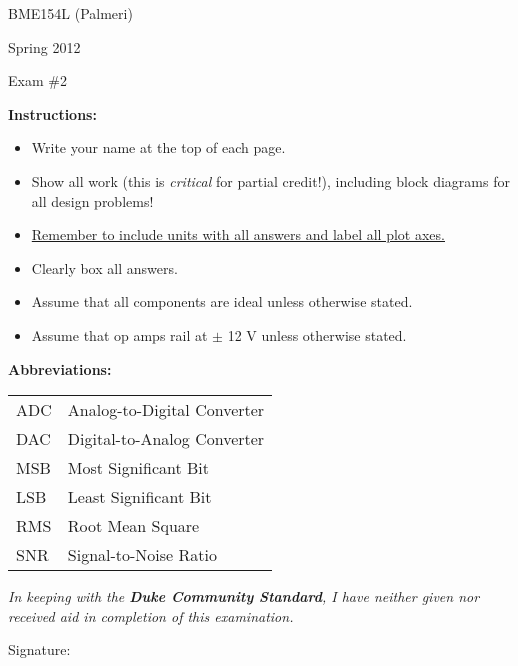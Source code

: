 

\vspace*{0.5in}

\centerline{\LARGE BME154L (Palmeri)}
\vspace*{0.25in}
\centerline{\LARGE Spring 2012}
\vspace*{0.25in}
\centerline{\LARGE Exam \#2}
\vspace*{0.25in}

{\bf Instructions:} 
\begin{itemize}
\item Write your name at the top of each page.
\item Show all work (this is {\it critical} for partial credit!), including block diagrams for all design problems!
\item \underline{Remember to include units with all answers and label all plot axes.}
\item Clearly box all answers.
\item Assume that all components are ideal unless otherwise stated.
\item Assume that op amps rail at $\pm$ 12 V unless otherwise stated.
\end{itemize}

{\bf Abbreviations:}

\begin{tabular}{ll}
ADC & Analog-to-Digital Converter \\
DAC & Digital-to-Analog Converter \\
MSB & Most Significant Bit \\
LSB & Least Significant Bit \\
RMS & Root Mean Square \\
SNR & Signal-to-Noise Ratio \\
\end{tabular}

\vspace*{1.0in}

\emph{\large In keeping with the {\bf Duke Community Standard}, I have neither given
nor received aid in completion of this examination.}

\vspace*{0.5in}

Signature:\underline{\hspace*{3.0in}}
